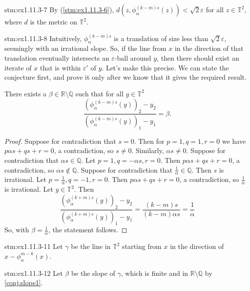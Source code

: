 \begin{statement}{stm:ex1.11.3-7}
By (\ref{stm:ex1.11.3-6}), $d(z, \phi_\alpha^{(k-m)s}(z)) < \sqrt{2} \varepsilon$ for all $z \in \mathbb{T}^2$, where $d$ is the metric on $\mathbb{T}^2$.
\end{statement}

\begin{explanation}{stm:ex1.11.3-8}
Intuitively, $\phi_\alpha^{(k-m)s}$ is a translation of size less than $\sqrt{2} \varepsilon$, seemingly with an irrational slope. So, if the line from $x$ in the direction of that translation eventually intersects an $\varepsilon$-ball around $y$, then there should exist an iterate of $x$ that is within $\varepsilon'$ of $y$. Let's make this precise. We can state the conjecture first, and prove it only after we know that it gives the required result.
\end{explanation}

\begin{conj}\label{conj:slope1}
There exists a  $\beta \in \mathbb{R} \setminus \mathbb{Q}$ such that for all $y \in \mathbb{T}^2$
\[
\frac{(\phi_\alpha^{(k-m)s}(y))_2 - y_2}{(\phi_\alpha^{(k-m)s}(y))_1 - y_1} = \beta.
\]
\end{conj}

\begin{proof}
    Suppose for contradiction that $s = 0$. Then for $p = 1, q = 1, r = 0$ we have $p \alpha s + q s + r = 0$, a contradiction, so $s \ne 0$. Similarly, $\alpha s \ne 0$. Suppose for contradiction that $\alpha s \in \mathbb{Q}$. Let $p = 1, q = -\alpha s, r = 0$. Then $p \alpha s + q s + r = 0$, a contradiction, so $\alpha s \not\in \mathbb{Q}$. Suppose for contradiction that $\frac{1}{\alpha} \in \mathbb{Q}$. Then $s$ is irrational. Let $p = \frac{1}{\alpha}, q = -1, r = 0$. Then $p \alpha s + q s + r = 0$, a contradiction, so $\frac{1}{\alpha}$ is irrational. Let $y \in \mathbb{T}^2$. Then $$\frac{(\phi_\alpha^{(k+m)s}(y))_2 - y_2}{(\phi_\alpha^{(k+m)s}(y))_1 - y_1} = \frac{(k-m)s}{(k-m)\alpha s} = \frac{1}{\alpha}$$
    So, with $\beta = \frac{1}{\alpha}$, the statement follows.
\end{proof}

\begin{statement}{stm:ex1.11.3-11}
Let $\gamma$ be the line in $\mathbb{T}^2$ starting from $x$ in the direction of $x - \phi_\alpha^{m-k}(x)$.
\end{statement}

\begin{statement}{stm:ex1.11.3-12}
Let $\beta$ be the slope of $\gamma$, which is finite and in $\mathbb{R} \setminus \mathbb{Q}$ by \ref{conj:slope1}.
\end{statement}

